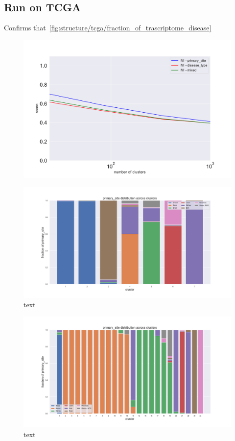 \subsection{Run on TCGA}
Confirms that~\ref{fig:structure/tcga/fraction_of_trascriptome_disease}

\begin{figure}[htb!]
    \centering
    \includegraphics[width=0.8\linewidth]{pictures/topic/tcga/metric.pdf}
    \caption{}
    \label{fig:topic/tcga/metric}
\end{figure}

\begin{figure}[htb!]
	\centering
	\includegraphics[width=0.8\linewidth]{pictures/topic/tcga/fraction_clustercomposition_l4_primary_site.png}
	\caption{text}
	\label{fig:topic/tcga/fraction_clustercomposition_l4_primary_site}
\end{figure}

\begin{figure}[htb!]
	\centering
	\includegraphics[width=0.8\linewidth]{pictures/topic/tcga/fraction_clustercomposition_l3_primary_site.png}
	\caption{text}
	\label{fig:topic/tcga/fraction_clustercomposition_l3_primary_site}
\end{figure}